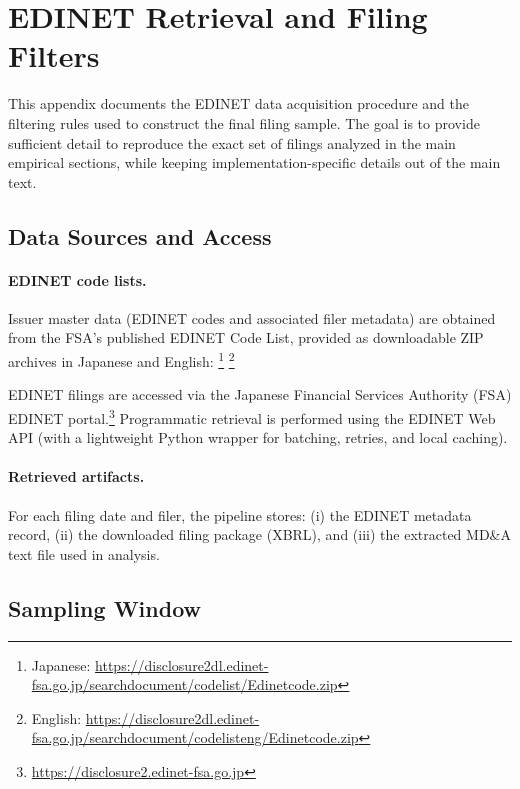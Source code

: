 \section{EDINET Retrieval and Filing Filters}
\label{appendix:edinet_retrieval}

This appendix documents the EDINET data acquisition procedure and the filtering rules used to construct the final filing sample. The goal is to provide sufficient detail to reproduce the exact set of filings analyzed in the main empirical sections, while keeping implementation-specific details out of the main text.

\subsection{Data Sources and Access}
\label{appendix:edinet_sources}

\paragraph{EDINET code lists.}
Issuer master data (EDINET codes and associated filer metadata) are obtained from the FSA’s published EDINET Code List, provided as downloadable ZIP archives in Japanese and English:
\footnote{Japanese: \url{https://disclosure2dl.edinet-fsa.go.jp/searchdocument/codelist/Edinetcode.zip}}
\footnote{English: \url{https://disclosure2dl.edinet-fsa.go.jp/searchdocument/codelisteng/Edinetcode.zip}}

EDINET filings are accessed via the Japanese Financial Services Authority (FSA) EDINET portal.\footnote{\url{https://disclosure2.edinet-fsa.go.jp}}
Programmatic retrieval is performed using the EDINET Web API (with a lightweight Python wrapper for batching, retries, and local caching).

\paragraph{Retrieved artifacts.}
For each filing date and filer, the pipeline stores: (i) the EDINET metadata record, (ii) the downloaded filing package (XBRL), and (iii) the extracted MD\&A text file used in analysis.

\subsection{Sampling Window}
\label{appendix:edinet_window}


